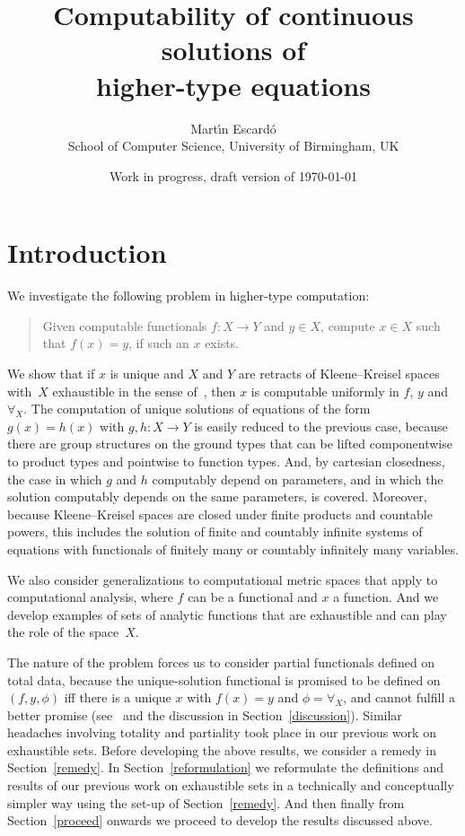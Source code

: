 \documentclass[10pt]{article}
\begin{document}
\author{Mart\'\i n Escard\'o \\
{\normalsize School of Computer Science, University of Birmingham, UK}}

\title{Computability of continuous solutions of \\ higher-type equations}

\date{{\normalsize Work in progress, draft version of \today}}

\maketitle

\section{Introduction}


We investigate the following problem in higher-type computation: 
\begin{quote}
  Given computable functionals $f \colon X \to Y$ and $y \in X$,
  compute $x \in X$ such that $f(x)=y$, if such an $x$ exists.
\end{quote}
We show that if $x$ is unique and $X$ and $Y$ are retracts
of Kleene--Kreisel spaces with~$X$ exhaustible in the sense
of~\cite{escardo:exhaustible}, then $x$ is computable uniformly in
$f$, $y$ and~$\forall_X$. The computation of unique solutions of
equations of the form $g(x)=h(x)$ with $g,h \colon X \to Y$ is easily
reduced to the previous case, because there are group structures on
the ground types that can be lifted componentwise to product types and
pointwise to function types. And, by cartesian closedness, the case in
which $g$ and $h$ computably depend on parameters, and in which the
solution computably depends on the same parameters, is covered.
Moreover, because Kleene--Kreisel spaces are closed under finite
products and countable powers, this includes the solution of finite
and countably infinite systems of equations with functionals of
finitely many or countably infinitely many variables.

We also consider generalizations to computational metric spaces that
apply to computational analysis, where $f$ can be a functional and $x$
a function. And we develop examples of sets of analytic functions that
are exhaustible and can play the role of the space~$X$.

The nature of the problem forces us to consider partial functionals
defined on total data, because the unique-solution functional is
promised to be defined on $(f,y,\phi)$ iff there is a unique $x$ with
$f(x)=y$ and $\phi=\forall_X$,
and cannot fulfill a better promise (see~\cite{beeson} and
the discussion in Section~\ref{discussion}).  Similar headaches
involving totality and partiality took place in our previous work on
exhaustible sets.  Before developing the above results, we consider a
remedy in Section~\ref{remedy}. In Section~\ref{reformulation} we
reformulate the definitions and results of our previous work on
exhaustible sets in a technically and conceptually simpler way using
the set-up of Section~\ref{remedy}. And then finally from
Section~\ref{proceed} onwards we proceed to develop the results discussed
above.
\end{document}
